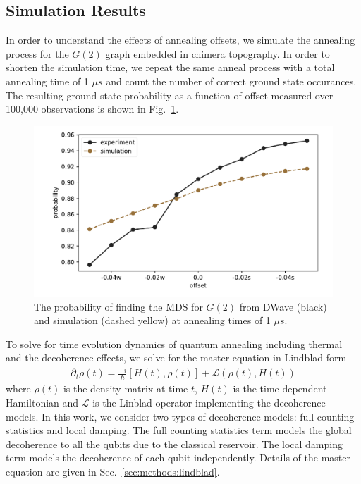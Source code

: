 \documentclass[prd,twocolumn,tightenlines,preprintnumbers,showpacs,superscriptaddress,notitlepage,nofootinbib,eqsecnum,floatfix,longbibliography,aps,10pt]{revtex4-2}
\begin{document}
\subsection{Simulation Results}
\label{sec:results:simulation}
In order to understand the effects of annealing offsets, we simulate the annealing process for the $G(2)$ graph embedded in chimera topography.
In order to shorten the simulation time, we repeat the same anneal process with a total annealing time of 1 $\mu s$ and count the number of correct ground state occurances.
The resulting ground state probability as a function of offset measured over 100,000 observations is shown in Fig.~\ref{fig:dwave1us}.

\begin{figure}[b]
	\centering
	\includegraphics[width=\columnwidth]{./new_figures/NN2_offset_scaling.pdf}
	\caption{The probability of finding the MDS for $G(2)$ from DWave (black) and simulation (dashed yellow) at annealing times of 1 $\mu s$.}
	\label{fig:dwave1us}
\end{figure}


To solve for time evolution dynamics of quantum annealing including thermal and the decoherence effects, we solve for the master equation in Lindblad form
\begin{align}
 \partial_t \rho (t) =  \frac{-i}{\hbar} [H(t) , \rho(t)] + \mathcal{L}(\rho(t), H(t))
\end{align}
where $\rho (t)$ is the density matrix at time $t$, $H(t)$ is the time-dependent Hamiltonian and $\mathcal{L}$ is the Linblad operator implementing the decoherence models.
In this work, we consider two types of decoherence models: full counting statistics and local damping.
The full counting statistics term models the global decoherence to all the qubits due to the classical reservoir.
The local damping term models the decoherence of each qubit independently.
Details of the master equation are given in Sec.~\ref{sec:methods:lindblad}.
\end{document}
